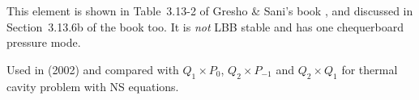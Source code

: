 
This element is shown in Table~3.13-2 of Gresho \& Sani's book \cite{grsa}, 
and discussed in Section~3.13.6b of the book too. It is {\it not} LBB stable
and has one chequerboard pressure mode.

Used in \textcite{grsu02} (2002) and compared with $Q_1\times P_0$, $Q_2\times P_{-1}$ and 
$Q_2\times Q_1$ for thermal cavity problem with NS equations.
